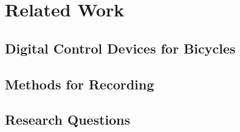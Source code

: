 \section{Related Work}\label{sec:related_work}


\cite{cycling_subjective_experience}

\subsection{Digital Control Devices for Bicycles}

\cite{brotate_and_tribike}
\subsection{Methods for Recording \CSE}

\subsection{Research Questions}
